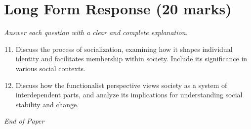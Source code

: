 \documentclass[12pt]{article}
\begin{document}
\section*{Long Form Response (20 marks)}
\textit{Answer each question with a clear and complete explanation.}
\begin{enumerate}[label=\arabic*.]
\setcounter{enumi}{10}
\item Discuss the process of socialization, examining how it shapes individual identity and facilitates membership within society. Include its significance in various social contexts.
\item Discuss how the functionalist perspective views society as a system of interdependent parts, and analyze its implications for understanding social stability and change.
\end{enumerate}

\vfill
\noindent\textit{End of Paper}
\end{document}
